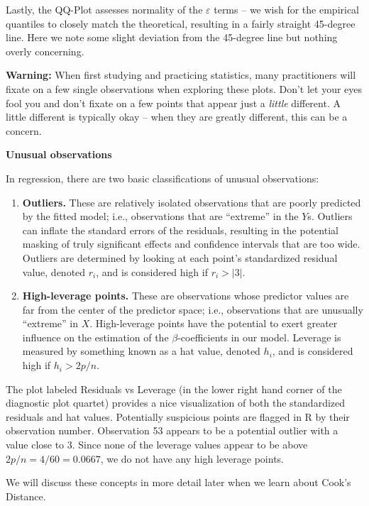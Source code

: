 \documentclass[
]{book}
\begin{document}
Lastly, the QQ-Plot assesses normality of the \(\varepsilon\) terms -- we wish for the empirical quantiles to closely match the theoretical, resulting in a fairly straight 45-degree line.
Here we note some slight deviation from the 45-degree line but nothing overly concerning.

\textbf{Warning:} When first studying and practicing statistics, many practitioners will fixate on a few single observations when exploring these plots.
Don't let your eyes fool you and don't fixate on a few points that appear just a \emph{little} different.
A little different is typically okay -- when they are greatly different, this can be a concern.

\textbf{Unusual observations}

In regression, there are two basic classifications of unusual observations:

\begin{enumerate}
\def\labelenumi{\arabic{enumi}.}
\item
  \textbf{Outliers.} These are relatively isolated observations that are poorly predicted by the fitted model; i.e., observations that are ``extreme'' in the \(Y\)s. Outliers can inflate the standard errors of the residuals, resulting in the potential masking of truly significant effects and confidence intervals that are too wide. Outliers are determined by looking at each point's standardized residual value, denoted \(r_i\), and is considered high if \(r_i > |3|\).
\item
  \textbf{High-leverage points.} These are observations whose predictor values are far from the center of the predictor space; i.e., observations that are unusually ``extreme'' in \(X\). High-leverage points have the potential to exert greater influence on the estimation of the \(\beta\)-coefficients in our model. Leverage is measured by something known as a hat value, denoted \(h_i\), and is considered high if \(h_i > 2p/n\).
\end{enumerate}

The plot labeled Residuals vs Leverage (in the lower right hand corner of the diagnostic plot quartet) provides a nice visualization of both the standardized residuals and hat values.
Potentially suspicious points are flagged in R by their observation number.
Observation 53 appears to be a potential outlier with a value close to 3.
Since none of the leverage values appear to be above \(2p/n = 4/60 = 0.0667\), we do not have any high leverage points.

We will discuss these concepts in more detail later when we learn about Cook's Distance.
\end{document}
